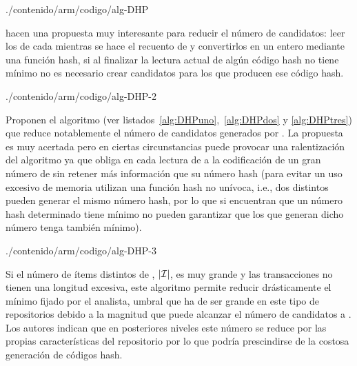 

                 {./contenido/arm/codigo/alg-DHP}                 

\citet{ParkChenYu-AnEffectiveHashBasedAlgorithmForARM-1995} hacen una propuesta muy interesante para reducir el número de candidatos: leer los \kitemsets[(k+1)] de cada \transaccion mientras se hace el recuento de \aprioriC y convertirlos en un entero mediante una función hash, si al finalizar la lectura actual de \D algún código hash no tiene \soporte mínimo no es necesario crear candidatos para los \kitemsets[(k+1)] que producen ese código hash.


                 {./contenido/arm/codigo/alg-DHP-2}

Proponen el algoritmo  (ver listados~\ref{alg:DHPuno},~\ref{alg:DHPdos} y \ref{alg:DHPtres}) que reduce notablemente el número de candidatos generados por \apriori. La propuesta es muy acertada pero en ciertas circunstancias puede provocar una ralentización del algoritmo ya que obliga en cada lectura de \D a la codificación de un gran número de \kitemsets[(k+1)] sin retener más información que su número hash (para evitar un uso excesivo de memoria utilizan una función hash no unívoca, i.e., dos \kitemsets[(k+1)] distintos pueden generar el mismo número hash, por lo que si encuentran que un número hash determinado tiene \soporte mínimo no pueden garantizar que los \itemsets que generan dicho número tenga también \soporte mínimo).


                 {./contenido/arm/codigo/alg-DHP-3}

Si el número de ítems distintos de \D, $|\I|$, es muy grande y las transacciones no tienen una longitud excesiva, este algoritmo permite reducir drásticamente el \soporte mínimo fijado por el analista, umbral que ha de ser grande en este tipo de repositorios debido a la magnitud que puede alcanzar el número de candidatos a \kitemsets[2]. Los autores indican que en posteriores niveles este número se reduce por las propias características del repositorio por lo que podría prescindirse de la costosa generación de códigos hash.

